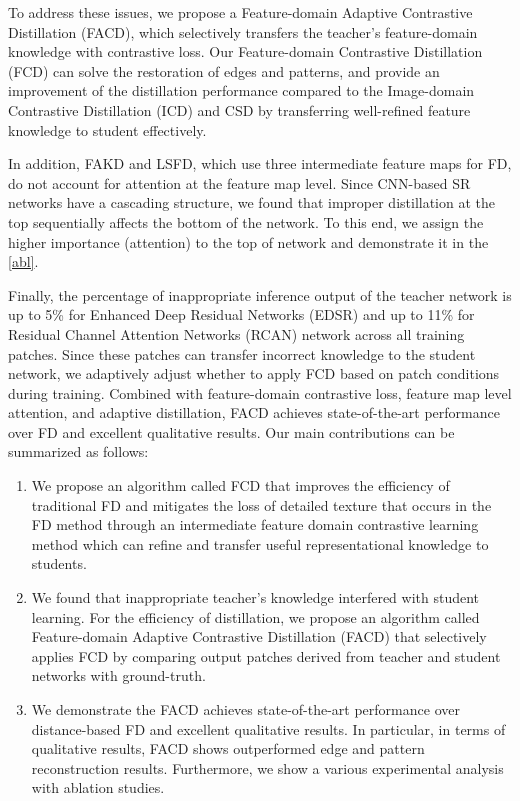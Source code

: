 \documentclass[10pt,twocolumn,letterpaper]{article}
\begin{document}
To address these issues, we propose a Feature-domain Adaptive Contrastive Distillation (FACD), which selectively transfers the teacher's feature-domain knowledge with contrastive loss. Our Feature-domain Contrastive Distillation (FCD) can solve the restoration of edges and patterns, and provide an improvement of the distillation performance compared to the Image-domain Contrastive Distillation (ICD) and CSD \cite{csd2021} by transferring well-refined feature knowledge to student effectively.

In addition, FAKD and LSFD, which use three intermediate feature maps for FD, do not account for attention at the feature map level. Since CNN-based SR networks have a cascading structure, we found that improper distillation at the top sequentially affects the bottom of the network. To this end, we assign the higher importance (attention) to the top of network and demonstrate it in the \cref{abl}.

Finally, the percentage of inappropriate inference output of the teacher network is up to 5\% for Enhanced Deep Residual Networks (EDSR) \cite{edsr2} and up to 11\% for Residual Channel Attention Networks (RCAN) \cite{RCAN} network across all training patches. Since these patches can transfer incorrect knowledge to the student network, we adaptively adjust whether to apply FCD based on patch conditions during training. Combined with feature-domain contrastive loss, feature map level attention, and adaptive distillation, FACD achieves state-of-the-art performance over FD and excellent qualitative results.
Our main contributions can be summarized as follows:
\begin{enumerate}
\item We propose an algorithm called FCD that improves the efficiency of traditional FD and mitigates the loss of detailed texture that occurs in the FD method through an intermediate feature domain contrastive learning method which can refine and transfer useful representational knowledge to students.
\item We found that inappropriate teacher's knowledge interfered with student learning. For the efficiency of distillation, we propose an algorithm called Feature-domain Adaptive Contrastive Distillation (FACD) that selectively applies FCD by comparing output patches derived from teacher and student networks with ground-truth. 
\item We demonstrate the FACD achieves state-of-the-art performance over distance-based FD and excellent qualitative results. In particular, in terms of qualitative results, FACD shows outperformed edge and pattern reconstruction results. Furthermore, we show a various experimental analysis with ablation studies.
\end{enumerate}
\end{document}

